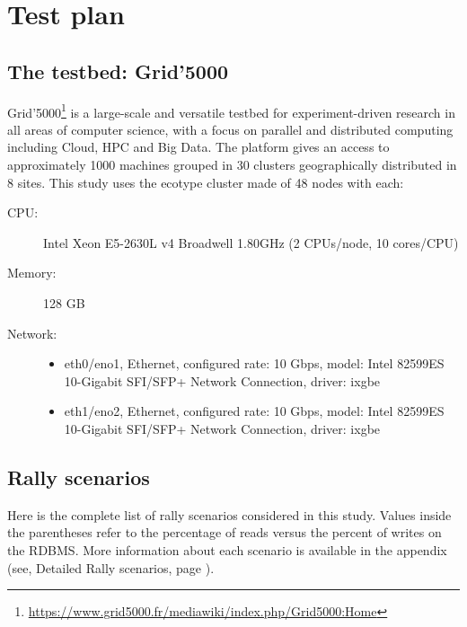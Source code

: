 \section{Test plan}
\label{sec:testplan}
\subsection{The testbed: Grid'5000}
Grid’5000\footnote{\url{https://www.grid5000.fr/mediawiki/index.php/Grid5000:Home}} is a large-scale and versatile testbed for experiment-driven research in all areas of computer science, with a focus on parallel and distributed computing including Cloud, HPC and Big Data. The platform gives an access to approximately 1000 machines grouped in 30 clusters geographically distributed in 8 sites. This study uses the ecotype cluster made of 48 nodes with each:

\begin{description}
    \item[CPU:] Intel Xeon E5-2630L v4 Broadwell 1.80GHz (2 CPUs/node, 10 cores/CPU)
    \item[Memory:] 128 GB
    \item[Network:]      \begin{itemize}
        \item eth0/eno1, Ethernet, configured rate: 10 Gbps, model: Intel 82599ES 10-Gigabit SFI/SFP+ Network Connection, driver: ixgbe
        \item eth1/eno2, Ethernet, configured rate: 10 Gbps, model: Intel 82599ES 10-Gigabit SFI/SFP+ Network Connection, driver: ixgbe
      \end{itemize}
\end{description}

\subsection{Rally scenarios}
\label{rally-scenarios}
Here is the complete list of rally scenarios considered in this study. Values inside the parentheses refer to the percentage of reads versus the percent of writes on the RDBMS. More information about each scenario is available in the appendix (see, Detailed Rally scenarios, page \pageref{sec:detail-rally}).


